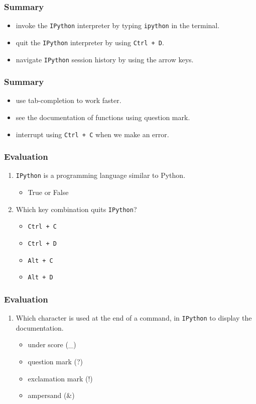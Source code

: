 \documentclass[17pt]{beamer}
\newcounter{saveenumi}
\newcommand{\seti}{\setcounter{saveenumi}{\value{enumi}}}
\newcommand{\conti}{\setcounter{enumi}{\value{saveenumi}}}
\begin{document}
\begin{frame}
\frametitle{Summary}
\begin{itemize}
\item invoke the \texttt{IPython} interpreter by typing \texttt{ipython} in the terminal.\pause
\item quit the \texttt{IPython} interpreter by using \texttt{Ctrl + D}.\pause
\item navigate \texttt{IPython} session history by using the arrow keys.
\end{itemize}
\end{frame}
\begin{frame}
\frametitle{Summary}
\begin{itemize}
\item use tab-completion to work faster.\pause
\item see the documentation of functions using question mark.\pause
\item interrupt using \texttt{Ctrl + C} when we make an error.
\end{itemize}
\end{frame}
\begin{frame}
\frametitle{Evaluation}
\begin{enumerate}
\item \texttt{IPython} is a programming language similar to Python.
\begin{itemize}
\item True or False\pause
\end{itemize}
\item Which key combination quits \texttt{IPython}?
\begin{itemize}
\item \texttt{Ctrl + C}
\item \texttt{Ctrl + D}
\item \texttt{Alt + C}
\item \texttt{Alt + D}
	\seti
\end{itemize}
\end{enumerate}
\end{frame}
\begin{frame}
\frametitle{Evaluation}
\begin{enumerate}
	\conti
\item Which character is used at the end of a command, in \texttt{IPython} to
display the documentation.
\begin{itemize}
\item under score (\_)
\item question mark (?)
\item exclamation mark (!)
\item ampersand (\&)
\end{itemize}
\end{enumerate}
\end{frame}
\end{document}
